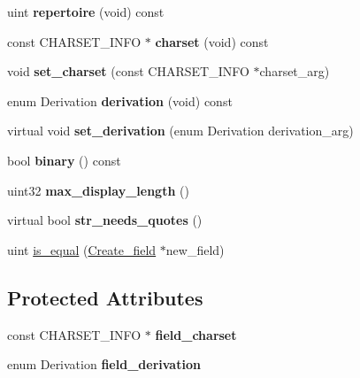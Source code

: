 \begin{DoxyCompactItemize}
\item 
\mbox{\label{classField__str_a88437df2aff3e6ccc5cd28ae1cdebf6a}} 
uint {\bfseries repertoire} (void) const
\item 
\mbox{\label{classField__str_a97c5336a1fc960203565d6178e726d9c}} 
const C\+H\+A\+R\+S\+E\+T\+\_\+\+I\+N\+FO $\ast$ {\bfseries charset} (void) const
\item 
\mbox{\label{classField__str_a871dfe0d98c21884bccdd137dadf32d7}} 
void {\bfseries set\+\_\+charset} (const C\+H\+A\+R\+S\+E\+T\+\_\+\+I\+N\+FO $\ast$charset\+\_\+arg)
\item 
\mbox{\label{classField__str_a2acd9aad09927915c05d246f9b74f0fb}} 
enum Derivation {\bfseries derivation} (void) const
\item 
\mbox{\label{classField__str_aee336e067b6ca2bae55a5c5024c9f7bf}} 
virtual void {\bfseries set\+\_\+derivation} (enum Derivation derivation\+\_\+arg)
\item 
\mbox{\label{classField__str_a046515c050f4a0da79f38dddaff251f5}} 
bool {\bfseries binary} () const
\item 
\mbox{\label{classField__str_a4f54afd9241999983c9c3bd0e52177c0}} 
uint32 {\bfseries max\+\_\+display\+\_\+length} ()
\item 
\mbox{\label{classField__str_af179689a3cc895014764fa7d27b2244e}} 
virtual bool {\bfseries str\+\_\+needs\+\_\+quotes} ()
\item 
uint \mbox{\hyperlink{classField__str_a281f4c166dbbfd070c6038c8b6f1595a}{is\+\_\+equal}} (\mbox{\hyperlink{classCreate__field}{Create\+\_\+field}} $\ast$new\+\_\+field)
\end{DoxyCompactItemize}
\subsection*{Protected Attributes}
\begin{DoxyCompactItemize}
\item 
\mbox{\label{classField__str_af56bb59888ae7bfebd1a315676512d24}} 
const C\+H\+A\+R\+S\+E\+T\+\_\+\+I\+N\+FO $\ast$ {\bfseries field\+\_\+charset}
\item 
\mbox{\label{classField__str_a01fad29459a95e4098009b6b2bf5f774}} 
enum Derivation {\bfseries field\+\_\+derivation}
\end{DoxyCompactItemize}
